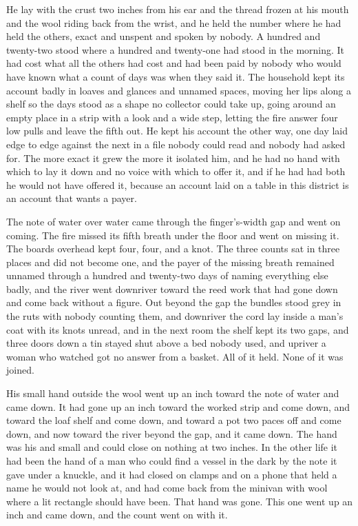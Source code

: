He lay with the crust two inches from his ear and the thread frozen at his mouth and the wool riding back from the wrist, and he held the number where he had held the others, exact and unspent and spoken by nobody. A hundred and twenty-two stood where a hundred and twenty-one had stood in the morning. It had cost what all the others had cost and had been paid by nobody who would have known what a count of days was when they said it. The household kept its account badly in loaves and glances and unnamed spaces, moving her lips along a shelf so the days stood as a shape no collector could take up, going around an empty place in a strip with a look and a wide step, letting the fire answer four low pulls and leave the fifth out. He kept his account the other way, one day laid edge to edge against the next in a file nobody could read and nobody had asked for. The more exact it grew the more it isolated him, and he had no hand with which to lay it down and no voice with which to offer it, and if he had had both he would not have offered it, because an account laid on a table in this district is an account that wants a payer.

The note of water over water came through the finger's-width gap and went on coming. The fire missed its fifth breath under the floor and went on missing it. The boards overhead kept four, four, and a knot. The three counts sat in three places and did not become one, and the payer of the missing breath remained unnamed through a hundred and twenty-two days of naming everything else badly, and the river went downriver toward the reed work that had gone down and come back without a figure. Out beyond the gap the bundles stood grey in the ruts with nobody counting them, and downriver the cord lay inside a man's coat with its knots unread, and in the next room the shelf kept its two gaps, and three doors down a tin stayed shut above a bed nobody used, and upriver a woman who watched got no answer from a basket. All of it held. None of it was joined.

His small hand outside the wool went up an inch toward the note of water and came down. It had gone up an inch toward the worked strip and come down, and toward the loaf shelf and come down, and toward a pot two paces off and come down, and now toward the river beyond the gap, and it came down. The hand was his and small and could close on nothing at two inches. In the other life it had been the hand of a man who could find a vessel in the dark by the note it gave under a knuckle, and it had closed on clamps and on a phone that held a name he would not look at, and had come back from the minivan with wool where a lit rectangle should have been. That hand was gone. This one went up an inch and came down, and the count went on with it.

